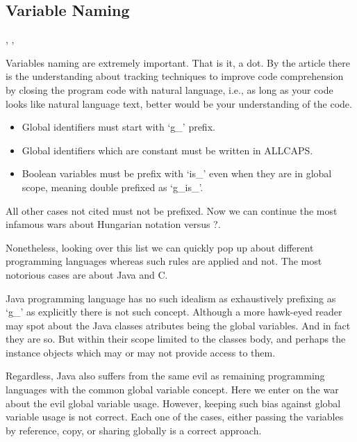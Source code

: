 \begin{englishtext}
    \subsection{Variable Naming}

    \cite{theImpactOfIdentifierStyle},
    \cite{womenAndMen},

    Variables naming are extremely important. That is it, a dot. By the article
     there is the understanding about tracking
    techniques to improve code comprehension by closing the program code with
    natural language, i.e., as long as your code looks like natural language
    text, better would be your understanding of the code.

    \begin{itemize}

    \item Global identifiers must start with `g\_' prefix.

    \item Global identifiers which are constant must be written in ALLCAPS.

    \item Boolean variables must be prefix with `is\_' even when they are in
    global scope, meaning double prefixed as `g\_is\_'.

    \end{itemize}

    All other cases not cited must not be prefixed. Now we can continue the most
    infamous wars about Hungarian notation versus ?.

    Nonetheless, looking over this list we can quickly pop up about different
    programming languages whereas such rules are applied and not. The most
    notorious cases are about Java and C.

    Java programming language has no such idealism as exhaustively prefixing as
    `g\_' as explicitly there is not such concept. Although a more hawk-eyed
    reader may spot about the Java classes atributes being the global variables.
    And in fact they are so. But within their scope limited to the classes body,
    and perhaps the instance objects which may or may not provide access to
    them.

    Regardless, Java also suffers from the same evil as remaining programming
    languages with the common global variable concept. Here we enter on the
    war about the evil global variable usage. However, keeping such bias against
    global variable usage is not correct. Each one of the cases, either passing
    the variables by reference, copy, or sharing globally is a correct approach.


\end{englishtext}
